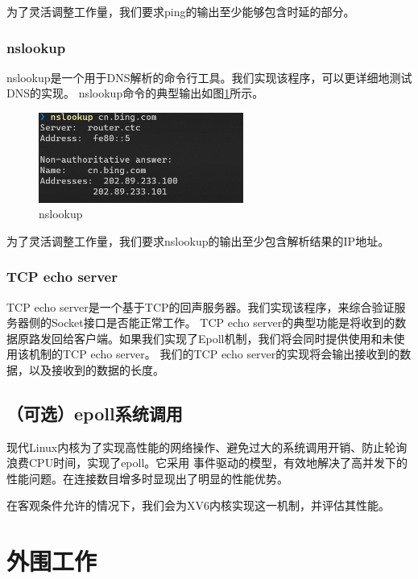 \documentclass[a4paper,twoside]{article}
\begin{document}
\begin{spacing}{1.2}
为了灵活调整工作量，我们要求ping的输出至少能够包含时延的部分。


\subsubsection{nslookup}

nslookup是一个用于DNS解析的命令行工具。我们实现该程序，可以更详细地测试DNS的实现。
nslookup命令的典型输出如图\ref{fig:nslookup}所示。

\begin{figure}[htb]
	\centering
	\caption{nslookup}
	\label{fig:nslookup}
	\includegraphics[width=0.6\textwidth]{nslookup.png}
\end{figure}

为了灵活调整工作量，我们要求nslookup的输出至少包含解析结果的IP地址。


\subsubsection{TCP echo server}

TCP echo server是一个基于TCP的回声服务器。我们实现该程序，来综合验证服务器侧的Socket接口是否能正常工作。
TCP echo server的典型功能是将收到的数据原路发回给客户端。如果我们实现了Epoll机制，我们将会同时提供使用和未使用该机制的TCP echo server。
我们的TCP echo server的实现将会输出接收到的数据，以及接收到的数据的长度。

\subsection{（可选）epoll系统调用}

现代Linux内核为了实现高性能的网络操作、避免过大的系统调用开销、防止轮询浪费CPU时间，实现了epoll。它采用
事件驱动的模型，有效地解决了高并发下的性能问题。在连接数目增多时显现出了明显的性能优势。

在客观条件允许的情况下，我们会为XV6内核实现这一机制，并评估其性能。


\section{外围工作}


\end{spacing}
\end{document}
